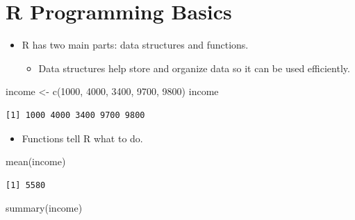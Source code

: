 \documentclass[
  letterpaper,
  DIV=11,
  numbers=noendperiod]{scrreprt}
\newenvironment{Shaded}{\begin{snugshade}}{\end{snugshade}}
\newcommand{\DecValTok}[1]{\textcolor[rgb]{0.68,0.00,0.00}{#1}}
\newcommand{\FunctionTok}[1]{\textcolor[rgb]{0.28,0.35,0.67}{#1}}
\newcommand{\NormalTok}[1]{\textcolor[rgb]{0.00,0.23,0.31}{#1}}
\newcommand{\OtherTok}[1]{\textcolor[rgb]{0.00,0.23,0.31}{#1}}
\providecommand{\tightlist}{%
  \setlength{\itemsep}{0pt}\setlength{\parskip}{0pt}}\usepackage{longtable,booktabs,array}
\begin{document}

\chapter{R Programming Basics}\label{r-programming-basics}

\begin{itemize}
\item
  R has two main parts: data structures and functions.

  \begin{itemize}
  \tightlist
  \item
    Data structures help store and organize data so it can be used
    efficiently.
  \end{itemize}
\end{itemize}

\begin{Shaded}
\begin{Highlighting}[]
\NormalTok{ income }\OtherTok{\textless{}{-}} \FunctionTok{c}\NormalTok{(}\DecValTok{1000}\NormalTok{, }\DecValTok{4000}\NormalTok{, }\DecValTok{3400}\NormalTok{, }\DecValTok{9700}\NormalTok{, }\DecValTok{9800}\NormalTok{)}
\NormalTok{ income}
\end{Highlighting}
\end{Shaded}

\begin{verbatim}
[1] 1000 4000 3400 9700 9800
\end{verbatim}

\begin{itemize}
\tightlist
\item
  Functions tell R what to do.
\end{itemize}

\begin{Shaded}
\begin{Highlighting}[]
\FunctionTok{mean}\NormalTok{(income)}
\end{Highlighting}
\end{Shaded}

\begin{verbatim}
[1] 5580
\end{verbatim}

\begin{Shaded}
\begin{Highlighting}[]
\FunctionTok{summary}\NormalTok{(income)}
\end{Highlighting}
\end{Shaded}
\end{document}
